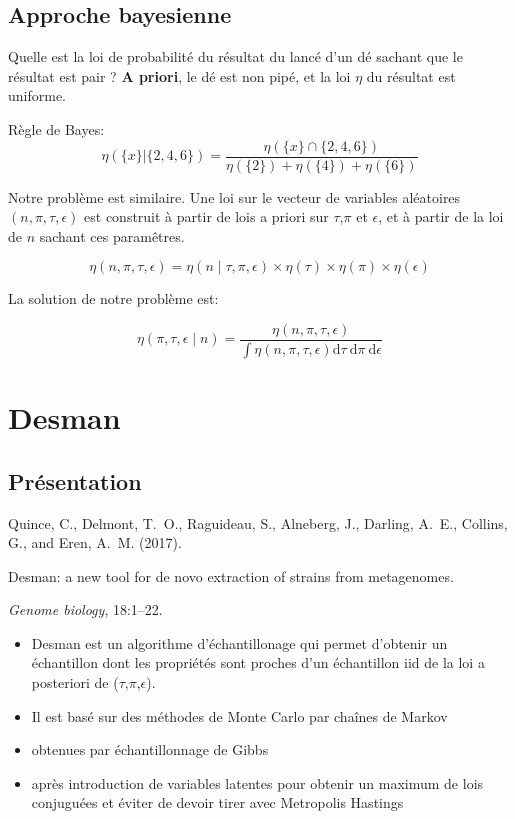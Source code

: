 \documentclass{beamer}
\newcommand{\fr}[1]{#1}
\newcommand{\en}[1]{}
\begin{document}
\subsection{\fr{Approche bayesienne}}
\begin{frame}{\en{Approche bayesienne}}
\fr{Quelle est la loi de probabilité du résultat du lancé d'un dé sachant que le résultat est pair ?
{\bf A priori}, le dé est non pipé, et la loi $\eta$ du résultat est uniforme.
}

\end{frame}
\begin{frame}{\en{Approche bayesienne (2)}}
\fr{Règle de Bayes:}
$$\eta(\{x\}|\{2,4,6\})=\frac{\eta(\{x\}\cap\{2,4,6\})}{\eta(\{2\})+\eta(\{4\})+\eta(\{6\})}$$
\end{frame}
\begin{frame}{}
\fr{Notre problème est similaire. Une loi sur le vecteur de variables aléatoires }$(n,\pi,\tau,\epsilon)$
\fr{est construit à partir de lois a priori sur }$\tau$,$\pi$ \fr{et}\en{and} $\epsilon$, \fr{et à partir de la loi de $n$ sachant ces paramêtres.}

$$\eta(n,\pi,\tau,\epsilon)=  \eta(n\mid \tau,\pi,\epsilon)\times\eta(\tau)\times\eta(\pi)\times\eta(\epsilon)$$

La solution de notre problème est:

$$\eta(\pi,\tau,\epsilon\mid n)=\frac{\eta(n,\pi,\tau,\epsilon)}{\int \eta(n,\pi,\tau,\epsilon) \mathrm{d}\tau~\mathrm{d}\pi~\mathrm{d}\epsilon}$$


\end{frame}


\section{Desman}
\subsection{Présentation}
\begin{frame}


Quince, C., Delmont, T.~O., Raguideau, S., Alneberg, J., Darling, A.~E.,
  Collins, G., and Eren, A.~M. (2017).

Desman: a new tool for de novo extraction of strains from
  metagenomes.

{\em Genome biology}, 18:1--22.

\end{frame}
\begin{frame}
\begin{itemize}
\item Desman est un algorithme d'échantillonage qui permet d'obtenir un échantillon dont les propriétés sont proches d'un échantillon iid de la loi a posteriori de ($\tau$,$\pi$,$\epsilon$).
\item Il est basé sur des méthodes de Monte Carlo par chaînes de Markov
\item obtenues par échantillonnage de Gibbs
\item après introduction de variables latentes pour obtenir un maximum de lois conjuguées et éviter de devoir tirer avec Metropolis Hastings
\end{itemize}
\end{frame}
\end{document}
